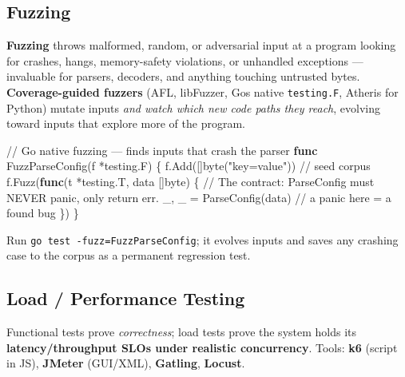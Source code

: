 \documentclass[11pt]{article}
\newenvironment{Shaded}{\begin{snugshade}}{\end{snugshade}}
\newcommand{\CommentTok}[1]{\textcolor[rgb]{0.48,0.49,0.49}{#1}}
\newcommand{\DataTypeTok}[1]{\textcolor[rgb]{0.16,0.50,0.73}{#1}}
\newcommand{\KeywordTok}[1]{\textcolor[rgb]{0.81,0.81,0.76}{\textbf{#1}}}
\newcommand{\NormalTok}[1]{\textcolor[rgb]{0.81,0.81,0.76}{#1}}
\newcommand{\OperatorTok}[1]{\textcolor[rgb]{0.81,0.81,0.76}{#1}}
\newcommand{\StringTok}[1]{\textcolor[rgb]{0.96,0.31,0.31}{#1}}
\begin{document}
\subsection{Fuzzing}\label{fuzzing}

\textbf{Fuzzing} throws malformed, random, or adversarial input at a program looking for crashes, hangs, memory-safety violations, or unhandled exceptions --- invaluable for parsers, decoders, and anything touching untrusted bytes. \textbf{Coverage-guided fuzzers} (AFL, libFuzzer, Go\textquotesingle s native \texttt{testing.F}, Atheris for Python) mutate inputs \emph{and watch which new code paths they reach}, evolving toward inputs that explore more of the program.


\begin{Shaded}
\begin{Highlighting}[]
\CommentTok{// Go native fuzzing — finds inputs that crash the parser}
\KeywordTok{func}\NormalTok{ FuzzParseConfig}\OperatorTok{(}\NormalTok{f }\OperatorTok{*}\NormalTok{testing}\OperatorTok{.}\NormalTok{F}\OperatorTok{)} \OperatorTok{\{}
\NormalTok{    f}\OperatorTok{.}\NormalTok{Add}\OperatorTok{([]}\DataTypeTok{byte}\OperatorTok{(}\StringTok{"key=value"}\OperatorTok{))}          \CommentTok{// seed corpus}
\NormalTok{    f}\OperatorTok{.}\NormalTok{Fuzz}\OperatorTok{(}\KeywordTok{func}\OperatorTok{(}\NormalTok{t }\OperatorTok{*}\NormalTok{testing}\OperatorTok{.}\NormalTok{T}\OperatorTok{,}\NormalTok{ data }\OperatorTok{[]}\DataTypeTok{byte}\OperatorTok{)} \OperatorTok{\{}
        \CommentTok{// The contract: ParseConfig must NEVER panic, only return err.}
\NormalTok{        \_}\OperatorTok{,}\NormalTok{ \_ }\OperatorTok{=}\NormalTok{ ParseConfig}\OperatorTok{(}\NormalTok{data}\OperatorTok{)}         \CommentTok{// a panic here = a found bug}
    \OperatorTok{\})}
\OperatorTok{\}}
\end{Highlighting}
\end{Shaded}

Run \texttt{go\ test\ -fuzz=FuzzParseConfig}; it evolves inputs and saves any crashing case to the corpus as a permanent regression test.

\subsection{Load / Performance Testing}\label{load--performance-testing}

Functional tests prove \emph{correctness}; load tests prove the system holds its \textbf{latency/throughput SLOs under realistic concurrency}. Tools: \textbf{k6} (script in JS), \textbf{JMeter} (GUI/XML), \textbf{Gatling}, \textbf{Locust}.
\end{document}
